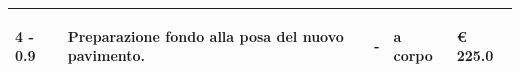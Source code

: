 \documentclass[a4paper]{article}
\begin{document}
\begin{tabular}{ | L{10mm} |  L{86mm} | L{12mm} | L{12mm} | L{16mm} | }
                            
                              \vspace{2.5mm}
                              \begin{spacing}{0}
                           4 - 0.9
                              \end{spacing} &
                              \vspace{2.5mm}
                              \begin{spacing}{0}
                           Preparazione fondo alla posa del nuovo pavimento.
                              \end{spacing} &
                              \vspace{2.5mm}
                              \begin{spacing}{0}
                           -
                              \end{spacing} &
                              \vspace{2.5mm}
                              \begin{spacing}{0}
                           a corpo
                              \end{spacing} &
                              \vspace{2.5mm}
                              \begin{spacing}{0}
                                \euro\hfill 
                            225.0
                              \end{spacing} \\
                              \hline


\end{tabular}
\end{document}
